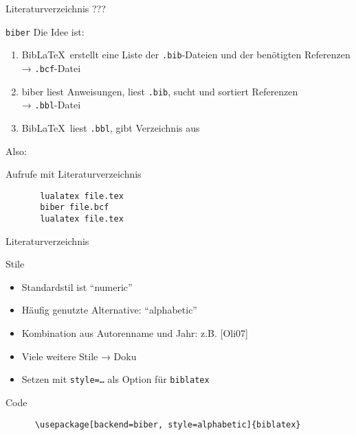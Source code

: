 \begin{frame}{Literaturverzeichnis}
  \centering
  \pause
  \Huge ???
\end{frame}

\begin{frame}[fragile]{\texttt{biber}}
  Die Idee ist:
  \begin{enumerate}
    \item Bib\LaTeX\ erstellt eine Liste der \texttt{.bib}-Dateien und der benötigten Referenzen \\
      → \texttt{.bcf}-Datei
    \item biber liest Anweisungen, liest \texttt{.bib}, sucht und sortiert Referenzen \\
      → \texttt{.bbl}-Datei
    \item Bib\LaTeX\ liest \texttt{.bbl}, gibt Verzeichnis aus
  \end{enumerate}

  \vspace{10pt}
  Also:
  \begin{block}{Aufrufe mit Literaturverzeichnis}
    \begin{lstlisting}
       lualatex file.tex
       biber file.bcf
       lualatex file.tex
    \end{lstlisting}
  \end{block}
\end{frame}

\begin{frame}{Literaturverzeichnis}
  \nocite{*}
  \printbibliography[heading=none]
\end{frame}

\begin{frame}[fragile]{Stile}
  \begin{itemize}
    \item Standardstil ist \enquote{numeric}
    \item Häufig genutzte Alternative: \enquote{alphabetic}
    \item Kombination aus Autorenname und Jahr: z.B. [Oli07]
    \item Viele weitere Stile → Doku
    \item Setzen mit \texttt{style=…} als Option für \texttt{biblatex}
  \end{itemize}
  \begin{block}{Code}
    \begin{lstlisting}
      \usepackage[backend=biber, style=alphabetic]{biblatex}
    \end{lstlisting}
  \end{block}
\end{frame}
